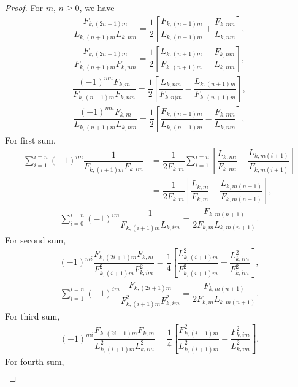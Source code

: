  \begin{proof}
For $m$, $n \geq 0$, we have
\begin{align*}
\dfrac{F_{k,(2n+1)m}}{L_{k,(n+1)m}L_{k,nm}}=\dfrac{1}{2}\left[\dfrac{F_{k,(n+1)m}}{L_{k,(n+1)m}}+\dfrac{F_{k,nm}}{L_{k,nm}}     \right], 
\end{align*}
\begin{align*}
\dfrac{F_{k,(2n+1)m}}{F_{k,(n+1)m}F_{k,nm}}=\dfrac{1}{2}\left[\dfrac{L_{k,(n+1)m}}{F_{k,(n+1)m}}+\dfrac{F_{k,nm}}{L_{k,nm}}     \right], 
\end{align*}
\begin{align*}
\dfrac{(-1)^{mn}F_{k,m}}{F_{k,(n+1)m}F_{k,nm}}=\dfrac{1}{2}\left[\dfrac{L_{k,nm}}{F_{k,n)m}}-\dfrac{L_{k,(n+1)m}}{F_{k,(n+1)m}}    \right], 
\end{align*}
\begin{align*}
\dfrac{(-1)^{mn}F_{k,m}}{L_{k,(n+1)m}L_{k,nm}}=\dfrac{1}{2}\left[\dfrac{F_{k,(n+1)m}}{L_{k,(n+1)m}} - \dfrac{F_{k,nm}}{L_{k,nm}}  \right],
\end{align*}
For first sum,
 \begin{align*}
   \sum_{i=1}^{i=n}(-1)^{im}\dfrac{1}{F_{k,(i+1)m}F_{k,im}} &= \dfrac{1}{2F_{k,m}} \sum_{i=1}^{i=n}\left[{\dfrac{L_{k,mi}}{F_{k,mi}}-\dfrac{L_{k,m(i+1)}}{F_{k,m(i+1)}}}\right]\\&=\dfrac{1}{2F_{k,m}}\left[\dfrac{L_{k,m}}{F_{k,m}}-\dfrac{L_{k,m(n+1)}}{F_{k,m(n+1)}}\right],
  \end{align*}
\begin{align*}
 \sum_{i=0}^{i=n}(-1)^{im}\dfrac{1}{F_{k,(i+1)m}L_{k,im}} = \dfrac{F_{k,m(n+1)}}{2F_{k,m}L_{k,m(n+1)}}.
\end{align*}
For second sum,
\begin{align*}
(-1)^{mi}\dfrac{F_{k,(2i+1)m}F_{k,m}}{F_{k,(i+1)m}^2F_{k,im}^2}=\dfrac{1}{4}\left[\dfrac{L_{k,(i+1)m}^2}{F_{k,(i+1)m}^2} - \dfrac{L_{k,im}^2}{F_{k,im}^2}  \right], 
\end{align*}
\begin{align*}
   \sum_{i=1}^{i=n}(-1)^{im}\dfrac{F_{k,(2i+1)m}}{F_{k,(i+1)m}^2 F_{k,im}^2} = \dfrac{F_{k,m(n+1)}}{2F_{k,m}L_{k,m(n+1)}}.
 \end{align*}
 For third sum,
\begin{align*}
(-1)^{mi}\dfrac{F_{k,(2i+1)m}F_{k,m}}{L_{k,(i+1)m}^2L_{k,im}^2}=\dfrac{1}{4}\left[\dfrac{F_{k,(i+1)m}^2}{L_{k,(i+1)m}^2} - \dfrac{F_{k,im}^2}{L_{k,im}^2}  \right]. 
\end{align*}
For fourth sum,
\begin{align*}

\end{align*}
\end{proof}
